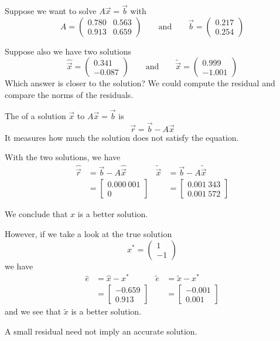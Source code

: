 Suppose we want to solve \( A \vec{x} = \vec{b} \) with \[
    A = \begin{pmatrix}
        0.780 & 0.563 \\ 0.913 & 0.659
    \end{pmatrix}
    \qquad \text{and} \qquad
    \vec{b} = \begin{pmatrix}
        0.217 \\ 0.254
    \end{pmatrix}
\]

Suppose also we have two solutions \[
    \hat{\vec{x}} = \begin{pmatrix}
        0.341 \\ -0.087
    \end{pmatrix}
    \qquad \text{and} \qquad
    \tilde{\vec{x}} = \begin{pmatrix}
        0.999 \\ -1.001
    \end{pmatrix}
\]
Which answer is closer to the solution? We could compute the residual and compare the norms of the residuals.

\begin{definition}[Residual]
    The  of a solution \( \vec{x} \) to \( A \vec{x} = \vec{b} \) is \[
        \vec{r} = \vec{b} - A \vec{x}
    \] It measures how much the solution does not satisfy the equation.
\end{definition}

With the two solutions, we have
\begin{align*}
    \hat{\vec{r}}
     & = \vec{b} - A \hat{\vec{x}}
     &
    \tilde{\vec{x}}
     & = \vec{b} - A \tilde{\vec{x}}
    \\
     & = \begin{bmatrix}
             0.000~001 \\ 0
         \end{bmatrix}
     &
     & = \begin{bmatrix}
             0.001~343 \\ 0.001~572
         \end{bmatrix}
\end{align*}

We conclude that \( \hat{x} \) is a better solution.

However, if we take a look at the true solution \[
    x^\ast = \begin{pmatrix} 1 \\ -1 \end{pmatrix}
\] we have 
\begin{align*}
    \hat{e}
     & = \hat{x} - x^\ast
     &
    \tilde{e}
        & = \tilde{x} - x^\ast
    \\
        & = \begin{bmatrix}
                -0.659 \\ 0.913
            \end{bmatrix}
        &
        & = \begin{bmatrix}
                -0.001 \\ 0.001
            \end{bmatrix}
\end{align*}
and we see that \( \tilde{x} \) is a better solution.

\begin{remark}
    A small residual need not imply an accurate solution.
\end{remark}